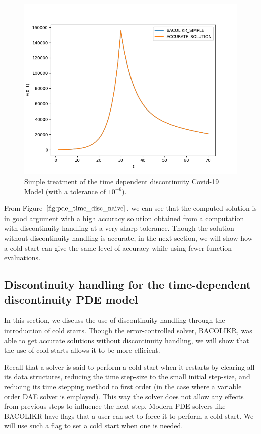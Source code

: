 \begin{figure}[H]
\centering
\includegraphics[width=0.7\linewidth]{./figures/pde_time_disc_naive}
\caption{Simple treatment of the time dependent discontinuity Covid-19 Model (with a tolerance of $10^{-6}$).}
\label{fig:pde_time_disc_naive}
\end{figure}

From Figure $\ref{fig:pde_time_disc_naive}$, we can see that the computed solution is in good argument with a high accuracy solution obtained from a computation with discontinuity handling at a very sharp tolerance. Though the solution without discontinuity handling is accurate, in the next section, we will show how a cold start can give the same level of accuracy while using fewer function evaluations.

\subsection{Discontinuity handling for the time-dependent discontinuity PDE model}
\label{subsubsection:pde_time_disc_hand}
In this section, we discuss the use of discontinuity handling through the introduction of cold starts. Though the error-controlled solver, BACOLIKR, was able to get accurate solutions without discontinuity handling, we will show that the use of cold starts allows it to be more efficient.

Recall that a solver is said to perform a cold start when it restarts by clearing all its data structures, reducing the time step-size to the small initial step-size, and reducing its time stepping method to first order (in the case where a variable order DAE solver is employed). This way the solver does not allow any effects from previous steps to influence the next step. Modern PDE solvers like BACOLIKR have flags that a user can set to force it to perform a cold start. We will use such a flag to set a cold start when one is needed.

